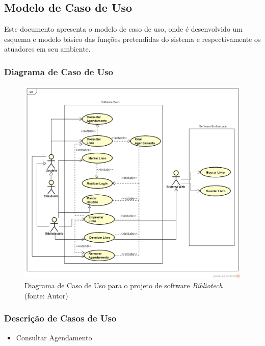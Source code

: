 \subsection[Modelo de Caso de Uso]{Modelo de Caso de Uso}
Este documento apresenta o modelo de caso de uso, onde é desenvolvido um esquema e modelo básico das funções pretendidas do sistema e respectivamente os atuadores em seu ambiente. 

\subsubsection{Diagrama de Caso de Uso}
\begin{figure}[!h]
\centering
\includegraphics[scale=0.50, angle = 360]{figuras/caso_uso}
\caption[]{Diagrama de Caso de Uso para o projeto de software \textit{Bibliotech} (fonte: Autor)}
\label{Diagrama de Caso de Uso para o projeto de software Bibliotech}

\end{figure}
\FloatBarrier

\subsubsection{Descrição de Casos de Uso}

\begin{itemize}
\item{Consultar Agendamento}
\end{itemize}

